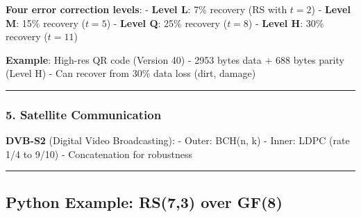 \textbf{Four error correction levels}: - \textbf{Level L}: 7\% recovery
(RS with \(t=2\)) - \textbf{Level M}: 15\% recovery (\(t=5\)) -
\textbf{Level Q}: 25\% recovery (\(t=8\)) - \textbf{Level H}: 30\%
recovery (\(t=11\))

\textbf{Example}: High-res QR code (Version 40) - 2953 bytes data + 688
bytes parity (Level H) - Can recover from 30\% data loss (dirt, damage)

\begin{center}\rule{0.5\linewidth}{0.5pt}\end{center}

\subsubsection{5. Satellite
Communication}\label{satellite-communication}

\textbf{DVB-S2} (Digital Video Broadcasting): - Outer: BCH(n, k) -
Inner: LDPC (rate 1/4 to 9/10) - Concatenation for robustness

\begin{center}\rule{0.5\linewidth}{0.5pt}\end{center}

\subsection{Python Example: RS(7,3) over
GF(8)}\label{python-example-rs73-over-gf8}


